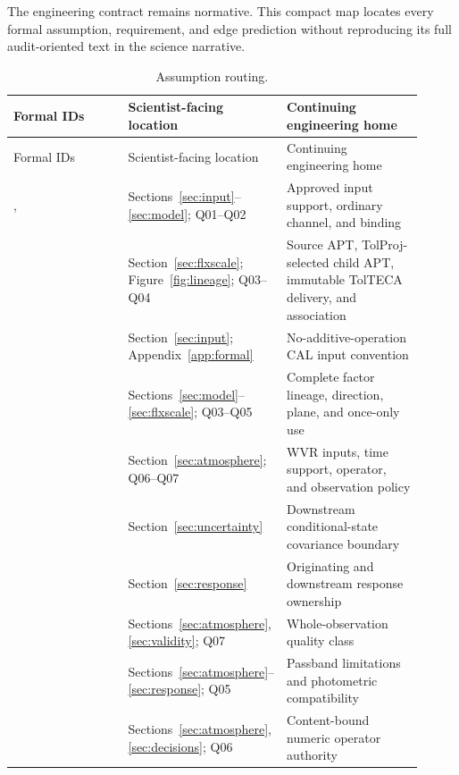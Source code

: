 \small
The engineering contract remains normative. This compact map locates every
formal assumption, requirement, and edge prediction without reproducing its
full audit-oriented text in the science narrative.

\begin{longtable}{L{0.30\linewidth}L{0.26\linewidth}L{0.35\linewidth}}
\caption{Assumption routing.}\\
\toprule Formal IDs & Scientist-facing location & Continuing engineering home \\
\midrule\endfirsthead\toprule Formal IDs & Scientist-facing location & Continuing engineering home \\
\midrule\endhead
{},  & Sections~\ref{sec:input}--\ref{sec:model}; Q01--Q02 & Approved input support, ordinary channel, and binding \\
 & Section~\ref{sec:flxscale}; Figure~\ref{fig:lineage}; Q03--Q04 & Source APT, TolProj-selected child APT, immutable TolTECA delivery, and association \\
 & Section~\ref{sec:input}; Appendix~\ref{app:formal} & No-additive-operation CAL input convention \\
 & Sections~\ref{sec:model}--\ref{sec:flxscale}; Q03--Q05 & Complete factor lineage, direction, plane, and once-only use \\
 & Section~\ref{sec:atmosphere}; Q06--Q07 & WVR inputs, time support, operator, and observation policy \\
 & Section~\ref{sec:uncertainty} & Downstream conditional-state covariance boundary \\
 & Section~\ref{sec:response} & Originating and downstream response ownership \\
 & Sections~\ref{sec:atmosphere}, \ref{sec:validity}; Q07 & Whole-observation quality class \\
 & Sections~\ref{sec:atmosphere}--\ref{sec:response}; Q05 & Passband limitations and photometric compatibility \\
 & Sections~\ref{sec:atmosphere}, \ref{sec:decisions}; Q06 & Content-bound numeric operator authority \\
\bottomrule
\end{longtable}

